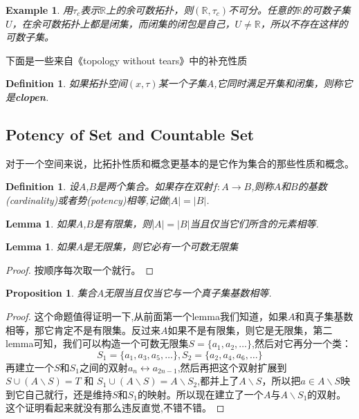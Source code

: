 \documentclass{article}
\newtheorem{lemma}[theorem]{Lemma}
\newtheorem{proposition}[theorem]{Proposition}
\newtheorem{example}[theorem]{Example}
\newtheorem{definition}[theorem]{Definition}
\newcommand*{\xfunc}[4]{{#2}\colon{#3}{#1}{#4}}
\newcommand*{\func}[3]{\xfunc{\to}{#1}{#2}{#3}}
\begin{document}
\begin{example}
用$\tau_c$表示$\mathbb{R}$上的余可数拓扑，则$(\mathbb{R},\tau_c)$不可分。任意的$\mathbb{R}$的可数子集$U$，在余可数拓扑上都是闭集，而闭集的闭包是自己，$U \neq \mathbb{R}$，所以不存在这样的可数子集。
\end{example}

下面是一些来自《topology without tears》中的补充性质

\begin{definition}
如果拓扑空间$(x,\tau)$某一个子集$A$,它同时满足开集和闭集，则称它是\textbf{clopen}.
\end{definition}

\newpage
\subsection{Potency of Set and Countable Set}

对于一个空间来说，比拓扑性质和概念更基本的是它作为集合的那些性质和概念。

\begin{definition}
设$A$,$B$是两个集合。如果存在双射$\func{f}{A}{B}$,则称$A$和$B$的基数(cardinality)或者势(potency)相等,记做$|A|=|B|$.
\end{definition}

\begin{lemma}
如果$A$,$B$是有限集，则$|A|=|B|$当且仅当它们所含的元素相等.
\end{lemma}

\begin{lemma}
如果$A$是无限集，则它必有一个可数无限集
\end{lemma}

\begin{proof}
按顺序每次取一个就行。
\end{proof}

\begin{proposition}
集合$A$无限当且仅当它与一个真子集基数相等.
\end{proposition}

\begin{proof}
这个命题值得证明一下,从前面第一个lemma我们知道，如果$A$和真子集基数相等，那它肯定不是有限集。反过来$A$如果不是有限集，则它是无限集，第二lemma可知，我们可以构造一个可数无限集$S=\{a_1,a_2,\ldots\}$,然后对它再分一个类：\[S_1 = \{a_1, a_3, a_5, \ldots\}, S_2 = \{a_2, a_4, a_6, \ldots\}\]再建立一个$S$和$S_1$之间的双射$a_n \leftrightarrow a_{2n-1}$,然后再把这个双射扩展到$S \cup (A \smallsetminus S) = T$ 和 $S_1 \cup (A \smallsetminus S) = A \smallsetminus S_2$,都并上了$A \smallsetminus S$，所以把$a \in A \smallsetminus S$映到它自己就行，还是维持$S$和$S_1$的映射。所以现在建立了一个$A$与$A \smallsetminus S_1$的双射。这个证明看起来就没有那么违反直觉,不错不错。
\end{proof}
\end{document}
